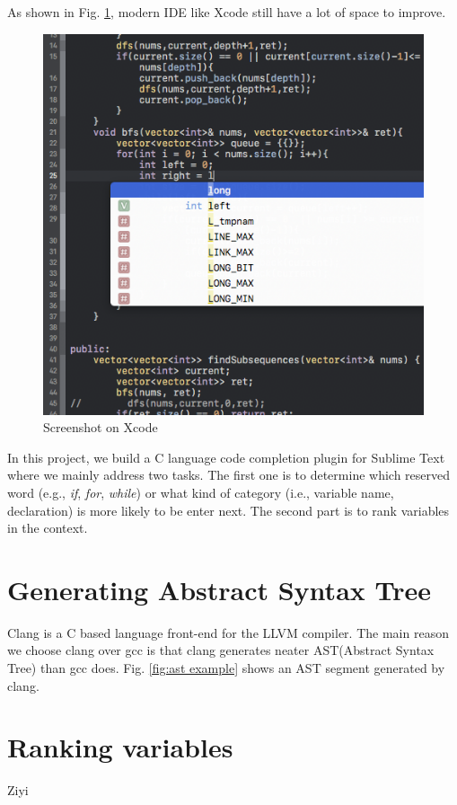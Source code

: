\documentclass[prodmode,acmtecs]{acmsmall} %
\begin{document}
As shown in Fig. \ref{fig:xcode}, modern IDE like Xcode still have a lot of space to improve. 

\begin{figure}
\centerline{\includegraphics[width=1.0\textwidth]{xcode}}
\caption{Screenshot on Xcode}
\label{fig:xcode}
\end{figure}


In this project, we build a C language code completion plugin for Sublime Text where we mainly address two tasks. The first one is to determine which reserved word (e.g., {\it if}, {\it for}, {\it while}) or what kind of category (i.e., variable name, declaration) is more likely to be enter next. The second part is to rank variables in the context.



\section{Generating Abstract Syntax Tree}
Clang is a C based language front-end for the LLVM compiler\cite{lattner2004llvm}. The main reason we choose clang over gcc is that clang generates neater AST(Abstract Syntax Tree) than gcc does. Fig. \ref{fig:ast example} shows an AST segment generated by clang. 

\section{Ranking variables}
Ziyi
\end{document}

